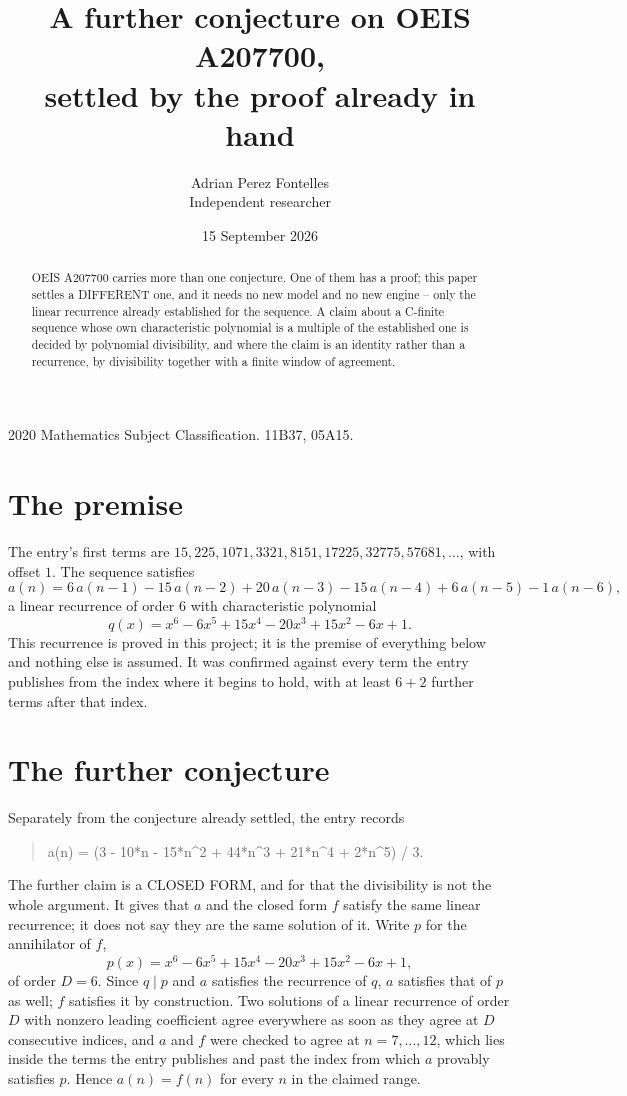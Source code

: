 \documentclass[11pt,a4paper]{article}
\title{A further conjecture on OEIS A207700,\\ \large settled by the proof already in hand}
\author{Adrian Perez Fontelles\\ \small Independent researcher}
\date{15 September 2026}
\theoremstyle{plain}
\theoremstyle{definition}
\begin{document}
\maketitle

\begin{abstract}
OEIS A207700 carries more than one conjecture. One of them has a proof; this paper settles a
DIFFERENT one, and it needs no new model and no new engine -- only the linear recurrence already
established for the sequence. A claim about a C-finite sequence whose own characteristic
polynomial is a multiple of the established one is decided by polynomial divisibility, and where
the claim is an identity rather than a recurrence, by divisibility together with a finite window
of agreement.
\end{abstract}

\noindent\small 2020 Mathematics Subject Classification. 11B37, 05A15.\normalsize

\section{The premise}

The entry's first terms are $15, 225, 1071, 3321, 8151, 17225, 32775, 57681,\dots$, with offset $1$. The sequence satisfies
\[
  a(n)=6\,a(n-1) - 15\,a(n-2) + 20\,a(n-3) - 15\,a(n-4) + 6\,a(n-5) - 1\,a(n-6) ,
\]
a linear recurrence of order $6$ with characteristic polynomial
\[
  q(x)=x^{6} - 6 x^{5} + 15 x^{4} - 20 x^{3} + 15 x^{2} - 6 x + 1 .
\]
This recurrence is proved in this project; it is the premise of everything below and nothing else is assumed.
It was confirmed against every term the entry publishes from the index where it begins to hold,
with at least $6+2$ further terms after that index.

\section{The further conjecture}

Separately from the conjecture already settled, the entry records

\begin{quote}\raggedright a(n) = (3 - 10*n - 15*n\^{}2 + 44*n\^{}3 + 21*n\^{}4 + 2*n\^{}5) / 3.\end{quote}

The further claim is a CLOSED FORM, and for that the divisibility is not the whole argument. It
gives that $a$ and the closed form $f$ satisfy the same linear recurrence; it does not say they
are the same solution of it. Write $p$ for the annihilator of $f$,
\[
  p(x)=x^{6} - 6 x^{5} + 15 x^{4} - 20 x^{3} + 15 x^{2} - 6 x + 1 ,
\]
of order $D=6$. Since $q\mid p$ and $a$ satisfies the recurrence of $q$, $a$ satisfies that of
$p$ as well; $f$ satisfies it by construction. Two solutions of a linear recurrence of order $D$
with nonzero leading coefficient agree everywhere as soon as they agree at $D$ consecutive
indices, and $a$ and $f$ were checked to agree at $n=7,\dots,12$,
which lies inside the terms the entry publishes and past the index from which $a$ provably
satisfies $p$. Hence $a(n)=f(n)$ for every $n$ in the claimed range.
\end{document}
